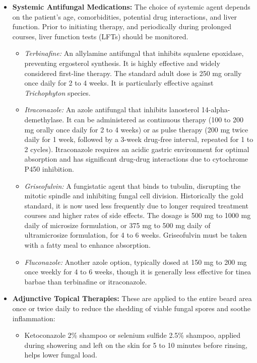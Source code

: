 \begin{itemize}
    \item \textbf{Systemic Antifungal Medications:} The choice of systemic agent depends on the patient's age, comorbidities, potential drug interactions, and liver function. Prior to initiating therapy, and periodically during prolonged courses, liver function tests (LFTs) should be monitored.
    \begin{itemize}
        \item \textit{Terbinafine:} An allylamine antifungal that inhibits squalene epoxidase, preventing ergosterol synthesis. It is highly effective and widely considered first-line therapy. The standard adult dose is 250 mg orally once daily for 2 to 4 weeks. It is particularly effective against \textit{Trichophyton} species.
        \item \textit{Itraconazole:} An azole antifungal that inhibits lanosterol 14-alpha-demethylase. It can be administered as continuous therapy (100 to 200 mg orally once daily for 2 to 4 weeks) or as pulse therapy (200 mg twice daily for 1 week, followed by a 3-week drug-free interval, repeated for 1 to 2 cycles). Itraconazole requires an acidic gastric environment for optimal absorption and has significant drug-drug interactions due to cytochrome P450 inhibition.
        \item \textit{Griseofulvin:} A fungistatic agent that binds to tubulin, disrupting the mitotic spindle and inhibiting fungal cell division. Historically the gold standard, it is now used less frequently due to longer required treatment courses and higher rates of side effects. The dosage is 500 mg to 1000 mg daily of microsize formulation, or 375 mg to 500 mg daily of ultramicrosize formulation, for 4 to 6 weeks. Griseofulvin must be taken with a fatty meal to enhance absorption.
        \item \textit{Fluconazole:} Another azole option, typically dosed at 150 mg to 200 mg once weekly for 4 to 6 weeks, though it is generally less effective for tinea barbae than terbinafine or itraconazole.
    \end{itemize}
    \item \textbf{Adjunctive Topical Therapies:} These are applied to the entire beard area once or twice daily to reduce the shedding of viable fungal spores and soothe inflammation:
    \begin{itemize}
        \item Ketoconazole 2\% shampoo or selenium sulfide 2.5\% shampoo, applied during showering and left on the skin for 5 to 10 minutes before rinsing, helps lower fungal load.

\end{itemize}
\end{itemize}
